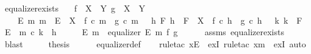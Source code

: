 \begin{isabellebody}
\isamarkupfalse%
\ equalizer{\isacharunderscore}{\kern0pt}exists{}{\isacharcolon}{\kern0pt}\isanewline
\ \ \ {\isachardoublequoteopen}f\ {\isacharcolon}{\kern0pt}\ X\ {\isasymrightarrow}\ Y{\isachardoublequoteclose}\ {\isachardoublequoteopen}g\ {\isacharcolon}{\kern0pt}\ X\ {\isasymrightarrow}\ Y{\isachardoublequoteclose}\isanewline
\ \ \ {\isachardoublequoteopen}{\isasymexists}\ E\ m{\isachardot}{\kern0pt}\ m\ {\isacharcolon}{\kern0pt}\ E\ {\isasymrightarrow}\ X\ {\isasymand}\ f\ {\isasymcirc}\isactrlsub c\ m\ {\isacharequal}{\kern0pt}\ g\ {\isasymcirc}\isactrlsub c\ m\ {\isasymand}\ {\isacharparenleft}{\kern0pt}{\isasymforall}\ h\ F{\isachardot}{\kern0pt}\ {\isacharparenleft}{\kern0pt}{\isacharparenleft}{\kern0pt}h\ {\isacharcolon}{\kern0pt}\ F\ {\isasymrightarrow}\ X{\isacharparenright}{\kern0pt}\ {\isasymand}\ {\isacharparenleft}{\kern0pt}f\ {\isasymcirc}\isactrlsub c\ h\ {\isacharequal}{\kern0pt}\ g\ {\isasymcirc}\isactrlsub c\ h{\isacharparenright}{\kern0pt}{\isacharparenright}{\kern0pt}\ {\isasymlongrightarrow}\ {\isacharparenleft}{\kern0pt}{\isasymexists}{\isacharbang}{\kern0pt}\ k{\isachardot}{\kern0pt}\ {\isacharparenleft}{\kern0pt}k\ {\isacharcolon}{\kern0pt}\ F\ {\isasymrightarrow}\ E{\isacharparenright}{\kern0pt}\ {\isasymand}\ m\ {\isasymcirc}\isactrlsub c\ k\ {\isacharequal}{\kern0pt}\ h{\isacharparenright}{\kern0pt}{\isacharparenright}{\kern0pt}{\isachardoublequoteclose}\isanewline
%
\isadelimproof
%
\endisadelimproof
%
\isatagproof
{}\isamarkupfalse%
\ {\isacharminus}{\kern0pt}\isanewline
\ \ \isamarkupfalse%
\ E\ m\ \ {\isachardoublequoteopen}equalizer\ E\ m\ f\ g{\isachardoublequoteclose}\isanewline
\ \ \ \ \isamarkupfalse%
\ assms\ equalizer{\isacharunderscore}{\kern0pt}exists\ \isamarkupfalse%
\ blast\isanewline
\ \ \isamarkupfalse%
\ \isamarkupfalse%
\ {\isacharquery}{\kern0pt}thesis\isanewline
\ \ \ \ \isamarkupfalse%
\ equalizer{\isacharunderscore}{\kern0pt}def\isanewline
\ \ \isamarkupfalse%
\ {\isacharparenleft}{\kern0pt}rule{\isacharunderscore}{\kern0pt}tac\ x{\isacharequal}{\kern0pt}{\isachardoublequoteopen}E{\isachardoublequoteclose}\ \ exI{\isacharcomma}{\kern0pt}\ rule{\isacharunderscore}{\kern0pt}tac\ x{\isacharequal}{\kern0pt}{\isachardoublequoteopen}m{\isachardoublequoteclose}\ \ exI{\isacharcomma}{\kern0pt}\ auto{\isacharparenright}{\kern0pt}\isanewline
\ \ \ \ \isamarkupfalse%

\end{isabellebody}
